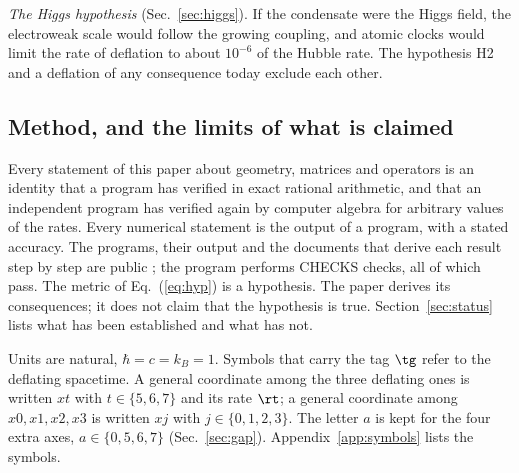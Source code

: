 \emph{The Higgs hypothesis} (Sec.~\ref{sec:higgs}).  If the condensate were the Higgs field, the electroweak scale would follow
the growing coupling, and atomic clocks would limit the rate of deflation to about $10^{-6}$ of the
Hubble rate. The hypothesis H2 and a deflation of any consequence today exclude each other.

\subsection{Method, and the limits of what is claimed}

Every statement of this paper about geometry, matrices and operators is an identity that a program
has verified in exact rational arithmetic, and that an independent program has verified again by
computer algebra for arbitrary values of the rates. Every numerical statement is the output of a
program, with a stated accuracy. The programs, their output and the documents that derive each result
step by step are public \cite{DeflationRepo}; the program performs {{CHECKS}} checks, all of which
pass. The metric of Eq.~(\ref{eq:hyp}) is a hypothesis. The paper derives its consequences; it does
not claim that the hypothesis is true. Section~\ref{sec:status} lists what has been established and
what has not.

Units are natural, $\hbar=c=k_B=1$. Symbols that carry the tag $\tg$ refer to the deflating
 spacetime. A general coordinate among the three deflating ones is written $xt$ with
$t\in\{5,6,7\}$ and its rate $\rt$; a general coordinate among $x0,x1,x2,x3$ is written $xj$ with $j\in\{0,1,2,3\}$. The letter $a$ is kept for the four extra axes, $a\in\{0,5,6,7\}$ (Sec.~\ref{sec:gap}).
Appendix~\ref{app:symbols} lists the symbols.

